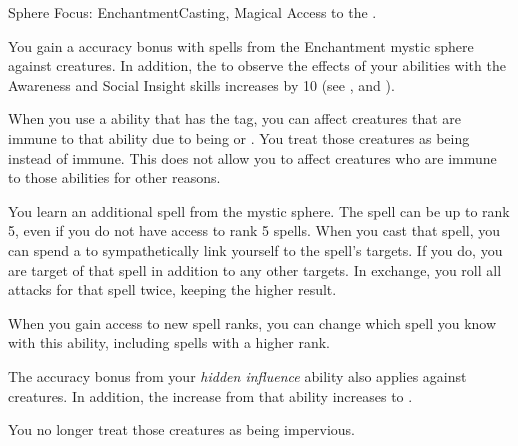   \begin{magicalfeat}{Sphere Focus: Enchantment}{Casting, Magical}
    \featpre Access to the  .

     You gain a  accuracy bonus with spells from the Enchantment mystic sphere against \unaware creatures.
    In addition, the  to observe the effects of your  abilities with the Awareness and Social Insight skills increases by 10 (see , and ).

     When you use a \magical ability that has the  tag, you can affect creatures that are immune to that ability due to being  or .
    You treat those creatures as being \impervious instead of immune.
    This does not allow you to affect creatures who are immune to those abilities for other reasons.

     You learn an additional  spell from the  mystic sphere.
    The spell can be up to rank 5, even if you do not have access to rank 5 spells.
    When you cast that spell, you can spend a  to sympathetically link yourself to the spell's targets.
    If you do, you are target of that spell in addition to any other targets.
    In exchange, you roll all attacks for that spell twice, keeping the higher result.

    When you gain access to new spell ranks, you can change which spell you know with this ability, including spells with a higher rank.

     The accuracy bonus from your \textit{hidden influence} ability also applies against \partiallyunaware creatures.
    In addition, the  increase from that ability increases to .

     You no longer treat those creatures as being impervious.
  \end{magicalfeat}

